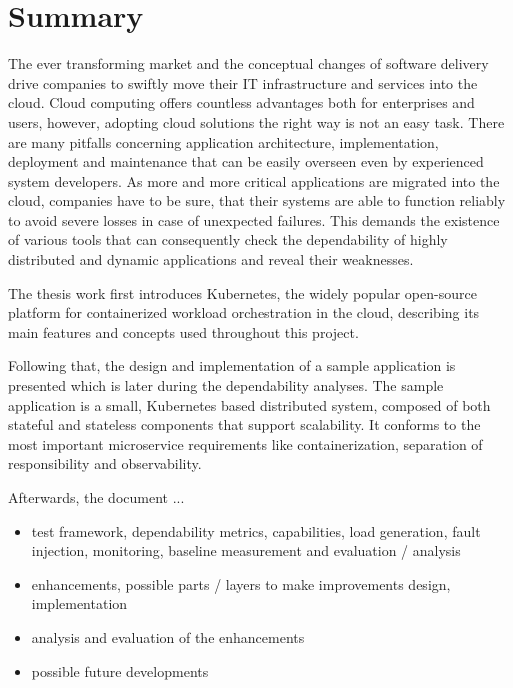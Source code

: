 \chapter{Summary}

The ever transforming market and the conceptual changes of software delivery drive companies to swiftly move their IT infrastructure and services into the cloud. Cloud computing offers countless advantages both for enterprises and users, however, adopting cloud solutions the right way is not an easy task. There are many pitfalls concerning application architecture, implementation, deployment and maintenance that can be easily overseen even by experienced system developers. As more and more critical applications are migrated into the cloud, companies have to be sure, that their systems are able to function reliably to avoid severe losses in case of unexpected failures. This demands the existence of various tools that can consequently check the dependability of highly distributed and dynamic applications and reveal their weaknesses.

The thesis work first introduces Kubernetes, the widely popular open-source platform for containerized workload orchestration in the cloud, describing its main features and concepts used throughout this project.

Following that, the design and implementation of a sample application is presented which is later during the dependability analyses. The sample application is a small, Kubernetes based distributed system, composed of both stateful and stateless components that support scalability. It conforms to the most important microservice requirements like containerization, separation of responsibility and observability.

Afterwards, the document ...

\begin{itemize}
	\item test framework, dependability metrics, capabilities, load generation, fault injection, monitoring, baseline measurement and evaluation / analysis
	\item enhancements, possible parts / layers to make improvements design, implementation
	\item analysis and evaluation of the enhancements
	\item possible future developments
\end{itemize}

